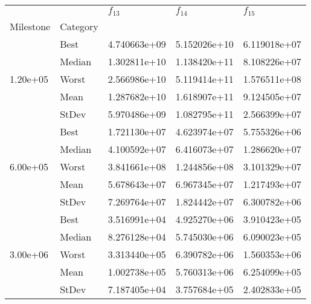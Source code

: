 \begin{tabular}{lllll}
\toprule
         &      &     $f_{13}$ &     $f_{14}$ &     $f_{15}$ \\
Milestone & Category &              &              &              \\
\midrule
\multirow{5}{*}{1.20e+05} & Best & 4.740663e+09 & 5.152026e+10 & 6.119018e+07 \\
         & Median & 1.302811e+10 & 1.138420e+11 & 8.108226e+07 \\
         & Worst & 2.566986e+10 & 5.119414e+11 & 1.576511e+08 \\
         & Mean & 1.287682e+10 & 1.618907e+11 & 9.124505e+07 \\
         & StDev & 5.970486e+09 & 1.082795e+11 & 2.566399e+07 \\
\cline{1-5}
\multirow{5}{*}{6.00e+05} & Best & 1.721130e+07 & 4.623974e+07 & 5.755326e+06 \\
         & Median & 4.100592e+07 & 6.416073e+07 & 1.286620e+07 \\
         & Worst & 3.841661e+08 & 1.244856e+08 & 3.101329e+07 \\
         & Mean & 5.678643e+07 & 6.967345e+07 & 1.217493e+07 \\
         & StDev & 7.269764e+07 & 1.824442e+07 & 6.300782e+06 \\
\cline{1-5}
\multirow{5}{*}{3.00e+06} & Best & 3.516991e+04 & 4.925270e+06 & 3.910423e+05 \\
         & Median & 8.276128e+04 & 5.745030e+06 & 6.090023e+05 \\
         & Worst & 3.313440e+05 & 6.390782e+06 & 1.560353e+06 \\
         & Mean & 1.002738e+05 & 5.760313e+06 & 6.254099e+05 \\
         & StDev & 7.187405e+04 & 3.757684e+05 & 2.402833e+05 \\
\bottomrule
\end{tabular}
